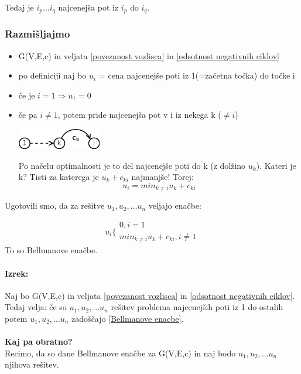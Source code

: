 \documentclass[a4paper,10pt]{article}
\begin{document}
Tedaj je $i_p...i_q$ najcenej\v sa pot iz $i_p$ do $i_q$.

\subsubsection{Razmi\v sljajmo}

\begin{itemize}
\item G(V,E,c) in veljata \ref{povezanost vozlisca} in \ref{odsotnost negativnih ciklov}
\item po definiciji naj bo $u_i$ = cena najcenej\v se poti iz 1(=za\v cetna to\v cka) do to\v cke i
\item \v ce je $i=1 \Rightarrow u_1=0$
\item \v ce pa $i \neq 1$, potem pride najcenej\v sa pot v i iz nekega k ($\neq i$)
		\begin{center}
	\includegraphics[width=3.65cm,height=0.9cm]{Slike/NajcenejsePoti3.png}
	\end{center}

	Po na\v celu optimalnosti je to del najcenej\v se poti do k (z dol\v zino $u_k$).
	Kateri je k?
	Tisti za katerega je $u_k + c_{ki}$ najmanj\v se!
	Torej:
	$$
	u_i = min_{k \neq i}{u_k + c_{ki}}
	$$
\end{itemize}
Ugotovili smo, da za re\v sitve $u_1, u_2,... u_n$ veljajo ena\v cbe:

\begin{equation}
u_i \lbrace
\begin{array}{l}
0, i=1 \\
min_{k \neq i}{u_k + c_{ki}}, i \neq 1
\end{array}
\label{Bellmanove enacbe}
\end{equation}
To so Bellmanove ena\v cbe.

\paragraph{Izrek:}
Naj bo G(V,E,c) in veljata \ref{povezanost vozlisca} in \ref{odsotnost negativnih ciklov}. Tedaj velja:
\v ce so $u_1, u_2,...u_n$ re\v sitev problema najcenej\v sih poti iz 1 do ostalih
potem $u_1, u_2,...u_n$ zado\v s\v cajo \ref{Bellmanove enacbe}.\\
\\
\textbf{Kaj pa obratno?}\\
Recimo, da so dane Bellmanove ena\v cbe za G(V,E,c) in naj bodo $u_1, u_2,... u_n$ njihova re\v sitev.
\end{document}
